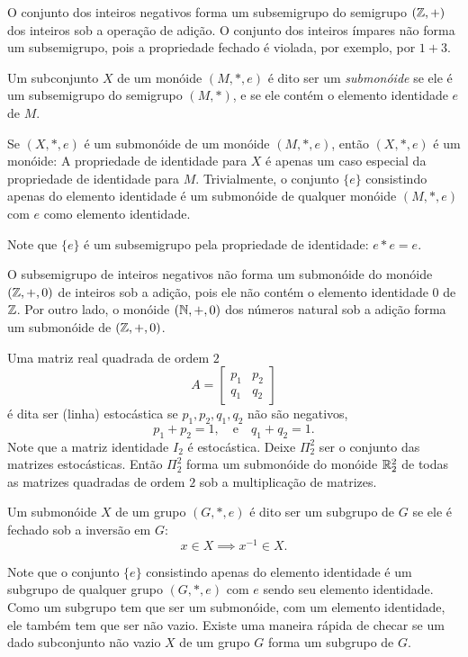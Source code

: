 \begin{exmp}
  O conjunto dos inteiros negativos forma um subsemigrupo do semigrupo $(\mathbb{Z}, +)$ dos inteiros sob a operação de adição. O conjunto dos inteiros ímpares não forma um subsemigrupo, pois a propriedade fechado é violada, por exemplo, por $1 + 3$.
\end{exmp}

\begin{definition}[Submonóides]
  Um subconjunto $X$ de um monóide $(M,*,e)$ é dito ser um \emph{submonóide} se ele é um subsemigrupo do semigrupo $(M,*)$, e se ele contém o elemento identidade $e$ de $M$.
\end{definition}
Se $(X,*,e)$ é um submonóide de um monóide $(M,*,e)$, então $(X,*,e)$ é um monóide: A propriedade de identidade para $X$ é apenas um caso especial da propriedade de identidade para $M$. Trivialmente, o conjunto $\{e\}$ consistindo apenas do elemento identidade é um submonóide de qualquer monóide $(M,*,e)$ com $e$ como elemento identidade.

Note que $\{e\}$ é um subsemigrupo pela propriedade de identidade: $e * e = e$.

\begin{exmp}
  O subsemigrupo de inteiros negativos não forma um submonóide do monóide $(\mathbb{Z},+,0)$ de inteiros sob a adição, pois ele não contém o elemento identidade $0$ de $\mathbb{Z}$. Por outro lado, o monóide $(\mathbb{N}, +,0)$ dos números natural sob a adição forma um submonóide de $(\mathbb{Z}, +,0)$.
\end{exmp}
\begin{exmp}
  Uma matriz real quadrada de ordem $2$
  $$A=\begin{bmatrix}
    p_{1} & p_{2}\\
    q_{1} & q_{2}
  \end{bmatrix}$$
  é dita ser (linha) estocástica se $p_{1},p_{2},q_{1},q_{2}$ não são negativos,
  $$p_{1} + p_{2} = 1,\quad \textrm{e}\quad q_{1} + q_{2} = 1.$$
  Note que a matriz identidade $I_{2}$ é estocástica. Deixe $\Pi_{2}^{2}$ ser o conjunto das matrizes estocásticas. Então $\Pi_{2}^{2}$ forma um submonóide do monóide $\mathbb{R}_{2}^{2}$ de todas as matrizes quadradas de ordem $2$ sob a multiplicação de matrizes.
\end{exmp}
\begin{definition}[Subgrupos]
  Um submonóide $X$ de um grupo $(G,*,e)$ é dito ser um subgrupo de $G$ se ele é fechado sob a inversão em $G$:
  $$x\in X \implies x^{-1} \in X.$$
\end{definition}
Note que o conjunto $\{e\}$ consistindo apenas do elemento identidade é um subgrupo de qualquer grupo $(G,*,e)$ com $e$ sendo seu elemento identidade. Como um subgrupo tem que ser um submonóide, com um elemento identidade, ele também tem que ser não vazio. Existe uma maneira rápida de checar se um dado subconjunto não vazio $X$ de um grupo $G$ forma um subgrupo de $G$.

